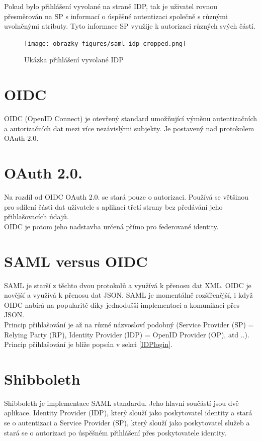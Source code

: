 Pokud bylo přihlášení vyvolané na straně IDP, tak je uživatel rovnou přesměrován na SP s informací o úspěšné autentizaci společně s různými uvolněnými atributy.
Tyto informace SP využije k autorizaci různých svých částí.\cite{SAMLxOIDC}

\begin{figure}[!thbp]
	\centering
    \texttt{[image: obrazky-figures/saml-idp-cropped.png]}
	\caption{Ukázka přihlášení vyvolané IDP\cite{SAMLxOIDC}}
	\label{saml-flow-idp}
\end{figure}

\section{OIDC}

OIDC (OpenID Connect) je otevřený standard umožňující výměnu autentizačních a autorizačních dat mezi více nezávislými subjekty. Je postavený nad protokolem OAuth 2.0.\cite{OIDC}

\section{OAuth 2.0.}
Na rozdíl od OIDC OAuth 2.0. se stará pouze o autorizaci. Používá se většinou pro sdílení části dat uživatele s aplikací třetí strany bez předávání jeho přihlašovacích údajů. \\
OIDC je potom jeho nadstavba určená přímo pro federované identity. \cite{OAUTHvSAMLvOIDC}

\section{SAML versus OIDC}

SAML je starší z těchto dvou protokolů a využívá k přenosu dat XML. OIDC je novější a využívá k přenosu dat JSON. 
SAML je momentálně rozšířenější, i když OIDC nabírá na popularitě díky jednodušší implementaci a komunikaci přes JSON.\cite{SAMLxOIDC} \\
Princip přihlašování je až na různé názvosloví podobný (Service Provider (SP) = Relying Party (RP),  Identity Provider (IDP) = OpenID Provider (OP), atd ..).
Princip přihlašování je blíže popsán v sekci \ref{IDPlogin}.




\section{Shibboleth}

Shibboleth je implementace SAML standardu. Jeho hlavní součástí jsou dvě aplikace. Identity Provider (IDP), který slouží jako poskytovatel identity a stará se o autentizaci a Service Provider (SP), který slouží jako poskytovatel služeb a stará se o autorizaci po úspěšném přihlášení přes poskytovatele identity. \cite{shibbolethWiki}



